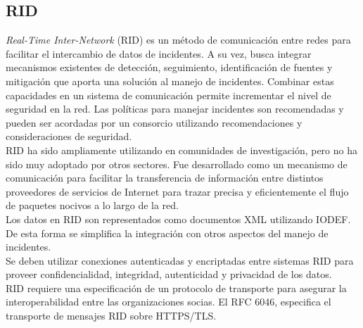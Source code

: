 \subsection{RID}

\textit{Real-Time Inter-Network} (RID) es un método de comunicación entre redes para 
facilitar el intercambio de datos de incidentes. A su vez, busca integrar 
mecanismos existentes de detección, seguimiento, identificación de fuentes y 
mitigación que aporta una solución al manejo de incidentes. Combinar estas 
capacidades en un sistema de comunicación permite incrementar el nivel de 
seguridad en la red. Las políticas para manejar incidentes son recomendadas y 
pueden ser acordadas por un consorcio utilizando recomendaciones y 
consideraciones de seguridad.\\

RID ha sido ampliamente utilizando en comunidades de investigación, pero no ha 
sido muy adoptado por otros sectores. Fue desarrollado como un mecanismo de 
comunicación para facilitar la transferencia de información entre distintos 
proveedores de servicios de Internet para trazar precisa y eficientemente el 
flujo de paquetes nocivos a lo largo de la red.\\

Los datos en RID son representados como documentos XML utilizando IODEF. De esta 
forma se simplifica la integración con otros aspectos del manejo de incidentes.\\ 

Se deben utilizar 
conexiones autenticadas y encriptadas entre sistemas RID para proveer 
confidencialidad, integridad, autenticidad y privacidad de los datos. \\

RID requiere una 
especificación de un protocolo de transporte para asegurar la interoperabilidad 
entre las organizaciones socias. El RFC 6046, especifica 
el transporte de mensajes RID sobre HTTPS/TLS. 












